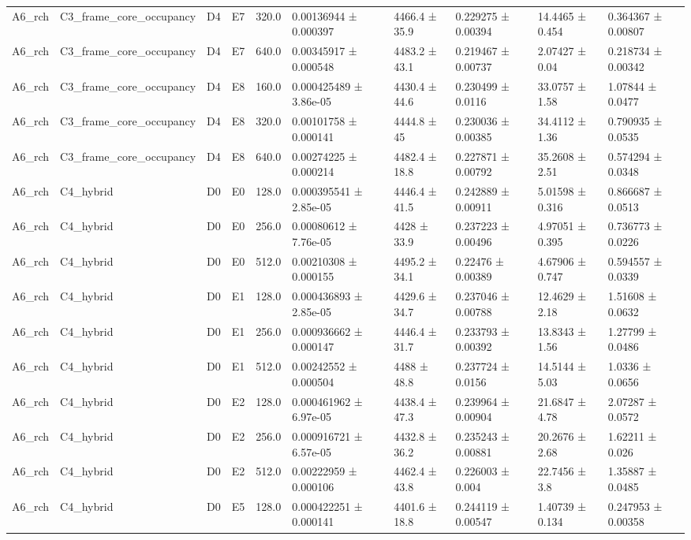 \begin{table}
\begin{tabular}{llllllllll}
A6\_rch & C3\_frame\_core\_occupancy & D4 & E7 & 320.0 & 0.00136944 ± 0.000397 & 4466.4 ± 35.9 & 0.229275 ± 0.00394 & 14.4465 ± 0.454 & 0.364367 ± 0.00807 \\
A6\_rch & C3\_frame\_core\_occupancy & D4 & E7 & 640.0 & 0.00345917 ± 0.000548 & 4483.2 ± 43.1 & 0.219467 ± 0.00737 & 2.07427 ± 0.04 & 0.218734 ± 0.00342 \\
A6\_rch & C3\_frame\_core\_occupancy & D4 & E8 & 160.0 & 0.000425489 ± 3.86e-05 & 4430.4 ± 44.6 & 0.230499 ± 0.0116 & 33.0757 ± 1.58 & 1.07844 ± 0.0477 \\
A6\_rch & C3\_frame\_core\_occupancy & D4 & E8 & 320.0 & 0.00101758 ± 0.000141 & 4444.8 ± 45 & 0.230036 ± 0.00385 & 34.4112 ± 1.36 & 0.790935 ± 0.0535 \\
A6\_rch & C3\_frame\_core\_occupancy & D4 & E8 & 640.0 & 0.00274225 ± 0.000214 & 4482.4 ± 18.8 & 0.227871 ± 0.00792 & 35.2608 ± 2.51 & 0.574294 ± 0.0348 \\
A6\_rch & C4\_hybrid & D0 & E0 & 128.0 & 0.000395541 ± 2.85e-05 & 4446.4 ± 41.5 & 0.242889 ± 0.00911 & 5.01598 ± 0.316 & 0.866687 ± 0.0513 \\
A6\_rch & C4\_hybrid & D0 & E0 & 256.0 & 0.00080612 ± 7.76e-05 & 4428 ± 33.9 & 0.237223 ± 0.00496 & 4.97051 ± 0.395 & 0.736773 ± 0.0226 \\
A6\_rch & C4\_hybrid & D0 & E0 & 512.0 & 0.00210308 ± 0.000155 & 4495.2 ± 34.1 & 0.22476 ± 0.00389 & 4.67906 ± 0.747 & 0.594557 ± 0.0339 \\
A6\_rch & C4\_hybrid & D0 & E1 & 128.0 & 0.000436893 ± 2.85e-05 & 4429.6 ± 34.7 & 0.237046 ± 0.00788 & 12.4629 ± 2.18 & 1.51608 ± 0.0632 \\
A6\_rch & C4\_hybrid & D0 & E1 & 256.0 & 0.000936662 ± 0.000147 & 4446.4 ± 31.7 & 0.233793 ± 0.00392 & 13.8343 ± 1.56 & 1.27799 ± 0.0486 \\
A6\_rch & C4\_hybrid & D0 & E1 & 512.0 & 0.00242552 ± 0.000504 & 4488 ± 48.8 & 0.237724 ± 0.0156 & 14.5144 ± 5.03 & 1.0336 ± 0.0656 \\
A6\_rch & C4\_hybrid & D0 & E2 & 128.0 & 0.000461962 ± 6.97e-05 & 4438.4 ± 47.3 & 0.239964 ± 0.00904 & 21.6847 ± 4.78 & 2.07287 ± 0.0572 \\
A6\_rch & C4\_hybrid & D0 & E2 & 256.0 & 0.000916721 ± 6.57e-05 & 4432.8 ± 36.2 & 0.235243 ± 0.00881 & 20.2676 ± 2.68 & 1.62211 ± 0.026 \\
A6\_rch & C4\_hybrid & D0 & E2 & 512.0 & 0.00222959 ± 0.000106 & 4462.4 ± 43.8 & 0.226003 ± 0.004 & 22.7456 ± 3.8 & 1.35887 ± 0.0485 \\
A6\_rch & C4\_hybrid & D0 & E5 & 128.0 & 0.000422251 ± 0.000141 & 4401.6 ± 18.8 & 0.244119 ± 0.00547 & 1.40739 ± 0.134 & 0.247953 ± 0.00358 \\

\end{tabular}
\end{table}
